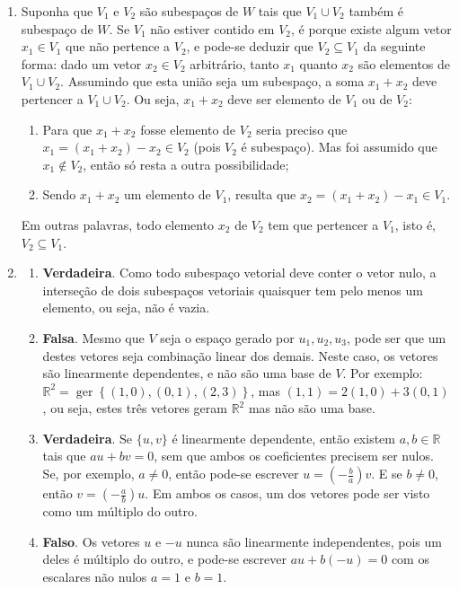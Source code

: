 \documentclass[12pt,a4paper]{article}
\newcommand*\ger[1]{\operatorname{ger}\left\{#1\right\}}
\newcommand*\R{\mathbb{R}}
\begin{document}
\begin{enumerate}
\item Suponha que $V_1$ e $V_2$ são subespaços de $W$ tais que $V_1 \cup V_2$ também é subespaço de $W$. Se $V_1$ não estiver contido em $V_2$, é porque existe algum vetor $x_1 \in V_1$ que não pertence a $V_2$, e pode-se deduzir que $V_2 \subseteq V_1$ da seguinte forma: dado um vetor $x_2 \in V_2$ arbitrário, tanto $x_1$ quanto $x_2$ são elementos de $V_1 \cup V_2$. Assumindo que esta união seja um subespaço, a soma $x_1 + x_2$ deve pertencer a $V_1 \cup V_2$. Ou seja, $x_1 + x_2$ deve ser elemento de $V_1$ ou de $V_2$:
\begin{enumerate}
\item Para que $x_1 + x_2$ fosse elemento de $V_2$ seria preciso que $x_1 = (x_1 + x_2) - x_2 \in V_2$ (pois $V_2$ é subespaço). Mas foi assumido que $x_1 \not \in V_2$, então só resta a outra possibilidade;
\item Sendo $x_1 + x_2$ um elemento de $V_1$, resulta que $x_2 = (x_1 + x_2) - x_1 \in V_1$.
\end{enumerate}
Em outras palavras, todo elemento $x_2$ de $V_2$ tem que pertencer a $V_1$, isto é, $V_2 \subseteq V_1$.


\item 
\begin{enumerate}
\item \textbf{Verdadeira}. Como todo subespaço vetorial deve conter o vetor nulo, a interseção de dois subespaços vetoriais quaisquer tem pelo menos um elemento, ou seja, não é vazia.
\item \textbf{Falsa}. Mesmo que $V$ seja o espaço gerado por ${ u_1, u_2, u_3 }$, pode ser que um destes vetores seja combinação linear dos demais. Neste caso, os vetores são linearmente dependentes, e não são uma base de $V$. Por exemplo: $\R^2 = \ger{(1,0),(0,1),(2,3)}$, mas $(1,1) = 2(1,0)+3(0,1)$, ou seja, estes três vetores geram $\R^2$ mas não são uma base.
\item \textbf{Verdadeira}. Se $\{u, v\}$ é linearmente dependente, então existem $a,b \in \R$ tais que $au+bv = 0$, sem que ambos os coeficientes precisem ser nulos. Se, por exemplo, $a \neq 0$, então pode-se escrever $u = (-\frac{b}{a}) v$. E se $b \neq 0$, então $v = (-\frac{a}{b}) u$. Em ambos os casos, um dos vetores pode ser visto como um múltiplo do outro.

\item \textbf{Falso}. Os vetores $u$ e $-u$ nunca são linearmente independentes, pois um deles é múltiplo do outro, e pode-se escrever $au + b(-u) = 0$ com os escalares não nulos $a=1$ e $b=1$.


\end{enumerate}
\end{enumerate}
\end{document}
